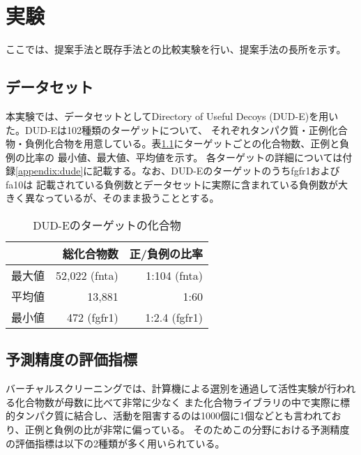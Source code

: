 \chapter{実験}
ここでは、提案手法と既存手法との比較実験を行い、提案手法の長所を示す。


\section{データセット}
本実験では、データセットとしてDirectory of Useful Decoys (DUD-E)\cite{Mysinger2012}を用いた。DUD-Eは102種類のターゲットについて、
それぞれタンパク質・正例化合物・負例化合物を用意している。表\ref{table:dude}にターゲットごとの化合物数、正例と負例の比率の
最小値、最大値、平均値を示す。
各ターゲットの詳細については付録\ref{appendix:dude}に記載する。なお、DUD-Eのターゲットのうちfgfr1およびfa10は
記載されている負例数とデータセットに実際に含まれている負例数が大きく異なっているが、そのまま扱うこととする。

\begin{table}[htb] \centering
	\caption{DUD-Eのターゲットの化合物}
	\label {table:dude}
	\begin{tabular}{c|rr|}
			&総化合物数		&正/負例の比率	\\ \hline
	最大値	&52,022 (fnta)		&1:104 (fnta)		\\
	平均値	&13,881			&1:60			\\
	最小値	&472 (fgfr1)		&1:2.4 (fgfr1)		\\ \hline
	\end{tabular}
\end{table}

	
\section{予測精度の評価指標}
バーチャルスクリーニングでは、計算機による選別を通過して活性実験が行われる化合物数が母数に比べて非常に少なく
また化合物ライブラリの中で実際に標的タンパク質に結合し、活動を阻害するのは1000個に1個などとも言われており、正例と負例の比が非常に偏っている。
そのためこの分野における予測精度の評価指標は以下の2種類が多く用いられている。

